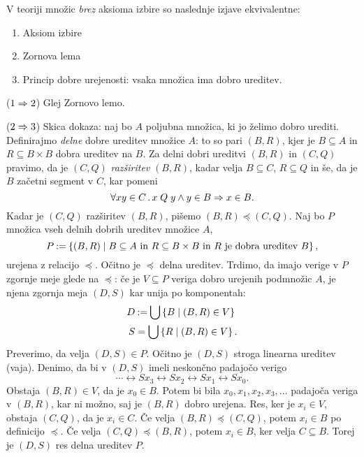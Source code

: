 \begin{izrek}
  V teoriji množic \emph{brez} aksioma izbire so naslednje izjave ekvivalentne:
  \begin{enumerate}
  \item Aksiom izbire
  \item Zornova lema
  \item Princip dobre urejenosti: vsaka množica ima dobro ureditev.
  \end{enumerate}
\end{izrek}

\begin{dokaz}
  ($1 \Rightarrow 2$) Glej Zornovo lemo.

  ($2 \Rightarrow 3$) Skica dokaza: naj bo $A$ poljubna množica, ki jo želimo dobro urediti.
  Definirajmo \emph{delne} dobre ureditev množice $A$: to so pari $(B,R)$, kjer je $B \subseteq A$
  in $R \subseteq B \times B$ dobra ureditev na $B$. Za delni dobri ureditvi $(B,R)$ in
  $(C,Q)$ pravimo, da je $(C,Q)$ \emph{razširitev} $(B,R)$, kadar velja $B \subseteq C$, $R \subseteq Q$ in
  še, da je $B$ začetni segment v $C$, kar pomeni
  \begin{equation*}
    \forall x y \in C \,.\, x \mathrel{Q} y \land y \in B \Rightarrow x \in B.
  \end{equation*}
  Kadar je $(C,Q)$ razširitev $(B,R)$, pišemo $(B,R) \preceq (C,Q)$. Naj bo $P$ množica vseh delnih
  dobrih ureditev množice $A$,
  \begin{equation*}
    P \mathbin{{:}{=}} \left\{ (B, R) \mid \text{$B \subseteq A$ in $R \subseteq B \times B$ in $R$ je dobra ureditev $B$}\right\},
  \end{equation*}
  urejena z relacijo $\preceq$. Očitno je $\preceq$ delna ureditev. Trdimo, da imajo verige v
  $P$ zgornje meje glede na $\preceq$: če je $V \subseteq P$ veriga dobro urejenih podmnožic
  $A$, je njena zgornja meja $(D,S)$ kar unija po komponentah:
  \begin{align*}
    D &\mathbin{{:}{=}} \bigcup \left\{B \mid (B, R) \in V\right\} \\
    S &= \bigcup \left\{R \mid (B, R) \in V\right\}.
  \end{align*}
  Preverimo, da velja $(D,S) \in P$. Očitno je $(D,S)$ stroga linearna ureditev
  (vaja). Denimo, da bi v $(D,S)$ imeli neskončno padajočo verigo
  \begin{equation*}
    \cdots \rel{S} x_3 \rel{S} x_2 \rel{S} x_1 \rel{S} x_0.
  \end{equation*}
  Obstaja $(B,R) \in V$, da je $x_0 \in B$. Potem bi bila $x_0, x_1, x_2, x_3, \ldots$
  padajoča veriga v $(B,R)$, kar ni možno, saj je $(B,R)$ dobro urejena. Res, ker
  je $x_i \in V$, obstaja $(C,Q)$, da je $x_i \in C$. Če velja $(B,R) \preceq (C,Q)$, potem
  $x_i \in B$ po definicijo $\preceq$. Če velja $(C,Q) \preceq (B,R)$, potem $x_i \in B$, ker velja
  $C \subseteq B$. Torej je $(D,S)$ res delna ureditev $P$.


\end{dokaz}
